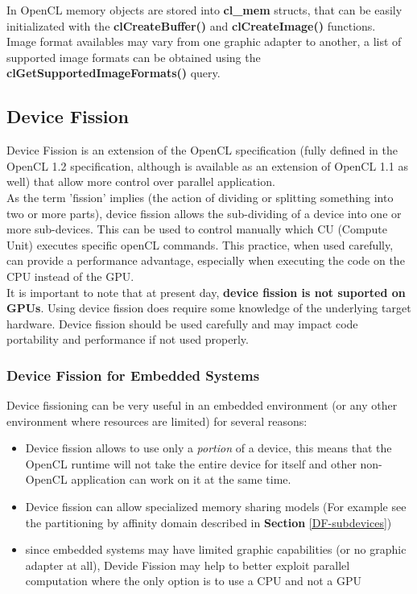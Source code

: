 \begin{CLCode}
In OpenCL memory objects are stored into \textbf{cl\_mem} structs, that can be easily initializated with the \textbf{clCreateBuffer()} and \textbf{clCreateImage()} functions.\\
Image format availables may vary from one graphic adapter to another, a list of supported image formats can be obtained using the \textbf{clGetSupportedImageFormats()} query.
\end{CLCode}





\subsection{Device Fission}

Device Fission is an extension of the OpenCL specification (fully defined in the OpenCL 1.2 specification, although is available as an extension of OpenCL 1.1 as well) that allow more control over parallel application.\\
As the term 'fission' implies (the action of dividing or splitting something into two or more parts), device fission allows the sub-dividing of a device into one or more sub-devices. This can be used to control manually which CU (Compute Unit) executes specific openCL commands. This practice, when used carefully, can provide a performance advantage, especially when executing the code on the CPU instead of the GPU.\cite{intel:12:DeviceFission}\\ It is important to note that at present day, \textbf{device fission is not suported on GPUs}.\cite{gaster:11:DeviceFission}
Using device fission does require some knowledge of the underlying target hardware. Device fission should be used carefully and may impact code portability and performance if not used properly.

\subsubsection{Device Fission for Embedded Systems}
Device fissioning can be very useful in an embedded environment (or any other environment where resources are limited) for several reasons:

\begin{itemize}
	\item Device fission allows to use only a \emph{portion} of a device, this means that the OpenCL runtime will not take the entire device for itself and other non-OpenCL application can work on it at the same time.
	\item Device fission can allow specialized memory sharing models (For example see the partitioning by affinity domain described in \textbf{Section} \ref{DF-subdevices})
	\item since embedded systems may have limited graphic capabilities (or no graphic adapter at all), Devide Fission may help to better exploit parallel computation where the only option is to use a CPU and not a GPU
\end{itemize}

